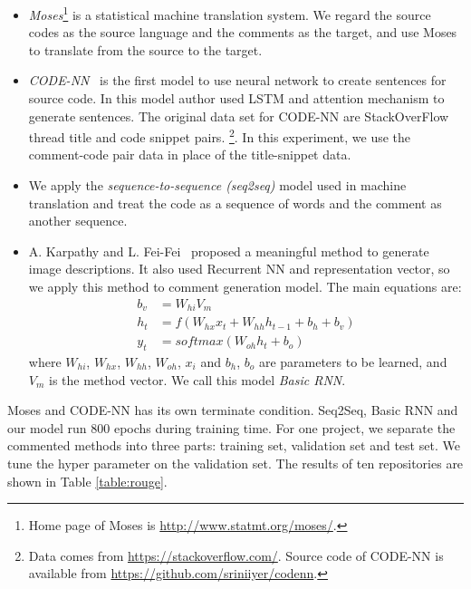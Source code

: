 \begin{itemize}
\item \emph{Moses}\footnote{Home page of Moses is \url{http://www.statmt.org/moses/}.}
 is a statistical machine translation system.
We regard the source codes as the source language and the comments as
the target, and use Moses to translate from the source to the target.
\item \emph{CODE-NN}~\cite{iyer2016summarizing} is the first model to use neural network to create sentences for source code. In this model author used LSTM and attention mechanism to generate sentences. The original data set for CODE-NN are
StackOverFlow thread title and code snippet pairs. \footnote{Data comes from
\url{https://stackoverflow.com/}. Source code of CODE-NN is available
from \url{https://github.com/sriniiyer/codenn}.}. In this experiment,
we use the comment-code pair data in place of the title-snippet data.
\item We apply the \emph{sequence-to-sequence (seq2seq)} model used
in machine translation \cite{Britz:2017} and treat the code as
a sequence of words and the comment as another sequence.
\item A. Karpathy and L. Fei-Fei~\cite{karpathy2015deep} proposed a meaningful method to generate image descriptions. It also used Recurrent NN and representation vector, so we apply this method to comment generation model. The main equations are:
\begin{align}
b_{v} &= W_{hi}V_{m}\\
h_{t} &= f(W_{hx}x_{t} + W_{hh}h_{t-1} + b_{h} + b_{v})\\
y_{t} &= softmax(W_{oh}h_{t} + b_{o})
\end{align}
where $W_{hi}$, $W_{hx}$, $W_{hh}$, $W_{oh}$, $x_{i}$ and $b_{h}$, $b_{o}$ are
parameters to be learned, and $V_{m}$ is the method vector.
We call this model \emph{Basic RNN}.
\end{itemize}
Moses and CODE-NN has its own terminate condition. Seq2Seq, Basic RNN and
our model run 800 epochs during training time.
For one project, we separate the commented methods into three parts:
training set, validation set and test set. We tune the hyper parameter on
the validation set. The results of ten repositories are shown
in Table \ref{table:rouge}.


